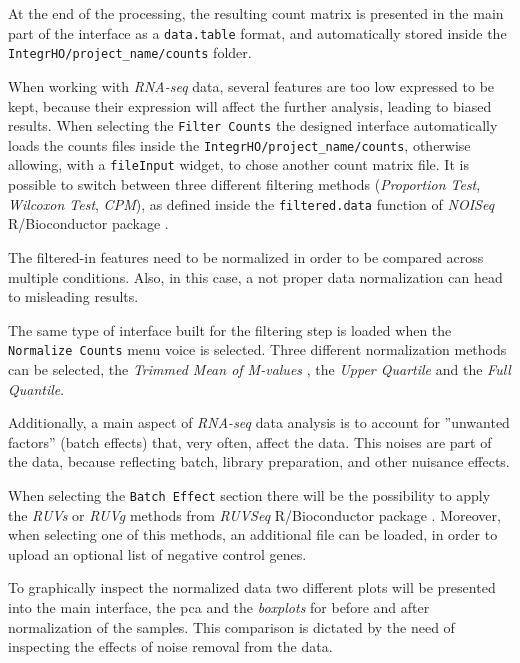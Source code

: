 At the end of the processing, the resulting count matrix is presented in the main part of the interface as a \lstinline!data.table! format, and automatically stored inside the \lstinline!IntegrHO/project_name/counts! folder.



When working with \textit{RNA-seq} data, several features are too low expressed to be kept, because their expression will affect the further analysis, leading to biased results.
When selecting the \lstinline!Filter Counts! the designed interface automatically loads the counts files inside the \lstinline!IntegrHO/project_name/counts!, otherwise allowing, with a \lstinline!fileInput! widget, to chose another count matrix file.
It is possible to switch between three different filtering methods (\textit{Proportion Test}, \textit{Wilcoxon Test}, \textit{CPM}), as defined inside the \lstinline!filtered.data! function of \textit{NOISeq} R/Bioconductor package \cite{Tarazona2012}.

The filtered-in features need to be normalized in order to be compared across multiple conditions.
Also, in this case, a not proper data normalization can head to misleading results.

The same type of interface built for the filtering step is loaded when the \lstinline!Normalize Counts! menu voice is selected.
Three different normalization methods can be selected, the \textit{Trimmed Mean of M-values} \cite{Robinson2010}, the \textit{Upper Quartile} and the \textit{Full Quantile}.

Additionally, a main aspect of \textit{RNA-seq} data analysis is to account for ''unwanted factors'' (batch effects) that, very often, affect the data.
This noises are part of the data, because reflecting batch, library preparation, and other nuisance effects.

When selecting the \lstinline!Batch Effect! section there will be the possibility to apply the \textit{RUVs} or \textit{RUVg} methods from \textit{RUVSeq} R/Bioconductor package \cite{Risso2014h}.
Moreover, when selecting one of this methods, an additional file can be loaded, in order to upload an optional list of negative control genes.

To graphically inspect the normalized data two different plots will be presented into the main interface, the \gls{pca} and the \textit{boxplots} for before and after normalization of the samples.
This comparison is dictated by the need of inspecting the effects of noise removal from the data.

